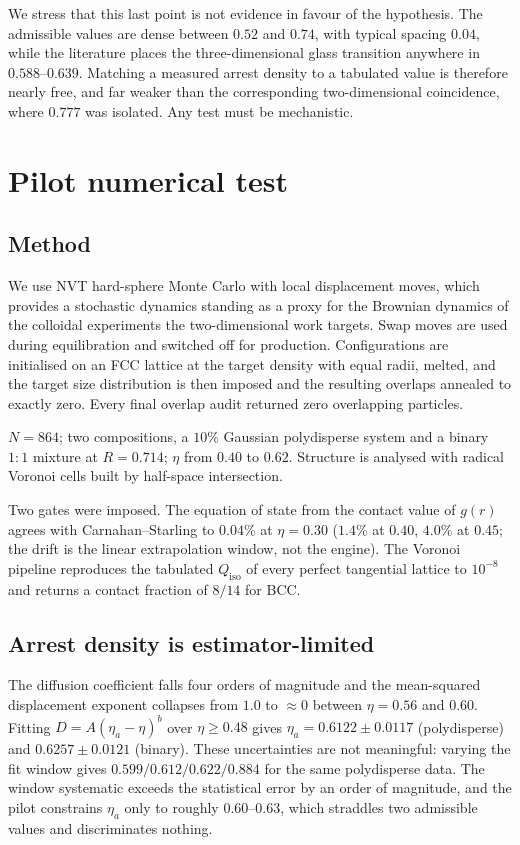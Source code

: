 \documentclass[aps,prl,twocolumn,superscriptaddress,floatfix]{revtex4-2}
\begin{document}
We stress that this last point is not evidence in favour of the hypothesis. The
admissible values are dense between $0.52$ and $0.74$, with typical spacing
$0.04$, while the literature places the three-dimensional glass transition
anywhere in $0.588$--$0.639$. Matching a measured arrest density to a tabulated
value is therefore nearly free, and far weaker than the corresponding
two-dimensional coincidence, where $0.777$ was isolated. Any test must be
mechanistic.

\section{Pilot numerical test}
\label{sec:pilot}

\subsection{Method}

We use NVT hard-sphere Monte Carlo with local displacement moves, which provides
a stochastic dynamics standing as a proxy for the Brownian dynamics of the
colloidal experiments the two-dimensional work targets. Swap moves are used
during equilibration and switched off for production. Configurations are
initialised on an FCC lattice at the target density with equal radii, melted, and
the target size distribution is then imposed and the resulting overlaps annealed
to exactly zero. Every final overlap audit returned zero overlapping particles.

$N=864$; two compositions, a $10\%$ Gaussian polydisperse system and a binary
$1{:}1$ mixture at $R=0.714$; $\eta$ from $0.40$ to $0.62$. Structure is analysed
with radical Voronoi cells built by half-space intersection.

Two gates were imposed. The equation of state from the contact value of $g(r)$
agrees with Carnahan--Starling to $0.04\%$ at $\eta=0.30$ ($1.4\%$ at $0.40$,
$4.0\%$ at $0.45$; the drift is the linear extrapolation window, not the engine).
The Voronoi pipeline reproduces the tabulated $Q_{\mathrm{iso}}$ of every perfect
tangential lattice to $10^{-8}$ and returns a contact fraction of $8/14$ for BCC.

\subsection{Arrest density is estimator-limited}

The diffusion coefficient falls four orders of magnitude and the mean-squared
displacement exponent collapses from $1.0$ to $\approx0$ between $\eta=0.56$ and
$0.60$. Fitting $D = A(\eta_a-\eta)^b$ over $\eta\geq0.48$ gives
$\eta_a=0.6122\pm0.0117$ (polydisperse) and $0.6257\pm0.0121$ (binary). These
uncertainties are not meaningful: varying the fit window gives
$0.599/0.612/0.622/0.884$ for the same polydisperse data. The window systematic
exceeds the statistical error by an order of magnitude, and the pilot constrains
$\eta_a$ only to roughly $0.60$--$0.63$, which straddles two admissible values
and discriminates nothing.
\end{document}
